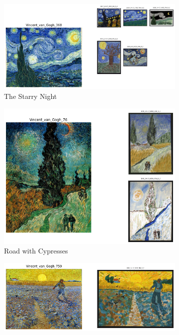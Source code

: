\begin{figure}
     \centering
     \begin{subfigure}[b]{0.45\textwidth}
         \centering
         \includegraphics[width=\textwidth]{images/example_pairs/Vincent_van_Gogh_368.png}
         \caption{The Starry Night}
     \end{subfigure}
     \hfil
     \begin{subfigure}[b]{0.45\textwidth}
         \centering
         \includegraphics[width=\textwidth]{images/example_pairs/Vincent_van_Gogh_76.png}
         \caption{Road with Cypresses}
     \end{subfigure}
     \hfil
     \begin{subfigure}[b]{0.45\textwidth}
         \centering
         \includegraphics[width=\textwidth]{images/example_pairs/Vincent_van_Gogh_750.png}

\end{subfigure}
\end{figure}
